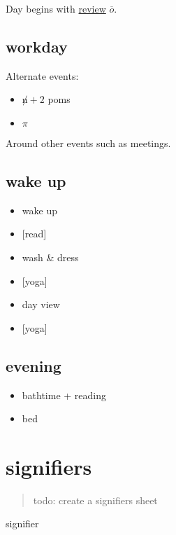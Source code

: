 \documentclass[]{book}
\providecommand{\tightlist}{%
  \setlength{\itemsep}{0pt}\setlength{\parskip}{0pt}}
\begin{document}
Day begins with \protect\hyperlink{review}{review} \(\overline o\).

\hypertarget{workday}{%
\subsection{workday}\label{workday}}

Alternate events:

\begin{itemize}
\tightlist
\item
  \(\not n + 2\) poms
\item
  \(\pi\)
\end{itemize}

Around other events such as meetings.

\hypertarget{wake-up}{%
\subsection{wake up}\label{wake-up}}

\begin{itemize}
\tightlist
\item
  wake up
\item
  {[}read{]}
\item
  wash \& dress
\item
  {[}yoga{]}
\item
  \protect\hypertarget{day-view}{}{day view}
\item
  {[}yoga{]}
\end{itemize}

\hypertarget{evening}{%
\subsection{evening}\label{evening}}

\begin{itemize}
\tightlist
\item
  bathtime + reading
\item
  bed
\end{itemize}

\hypertarget{signifiers}{%
\section{signifiers}\label{signifiers}}

\begin{quote}
todo: create a signifiers sheet
\end{quote}

signifier
\end{document}
